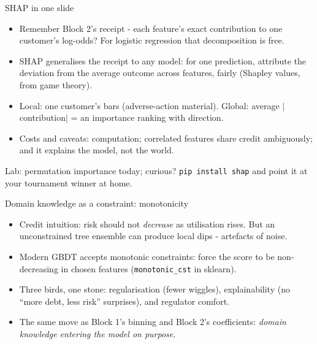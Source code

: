 \documentclass[10pt,aspectratio=169]{beamer}
\begin{document}
\begin{frame}{SHAP in one slide}
  \begin{itemize}
    \item Remember Block 2's receipt - each feature's exact contribution
          to one customer's log-odds? For logistic regression that
          decomposition is free.
    \item \alert{SHAP} generalises the receipt to any model: for one
          prediction, attribute the deviation from the average outcome
          across features, fairly (Shapley values, from game theory).
    \item Local: one customer's bars (adverse-action material). Global:
          average $|$contribution$|$ = an importance ranking with
          direction.
    \item Costs and caveats: computation; correlated features share credit
          ambiguously; and it explains \alert{the model}, not the world.
  \end{itemize}
  \vspace{0.4em}
  \begin{center}\small
    Lab: permutation importance today; curious? \texttt{pip install shap}
    and point it at your tournament winner at home.
  \end{center}
\end{frame}

\begin{frame}{Domain knowledge as a constraint: monotonicity}
  \begin{itemize}
    \item Credit intuition: risk should not \emph{decrease} as utilisation
          rises. But an unconstrained tree ensemble can produce local
          \alert{dips} - artefacts of noise.
    \item Modern GBDT accepts \alert{monotonic constraints}: force the
          score to be non-decreasing in chosen features
          (\texttt{monotonic\_cst} in sklearn).
    \item Three birds, one stone: regularisation (fewer wiggles),
          explainability (no ``more debt, less risk'' surprises), and
          regulator comfort.
    \item The same move as Block 1's binning and Block 2's coefficients:
          \emph{domain knowledge entering the model on purpose}.
  \end{itemize}
\end{frame}
\end{document}
